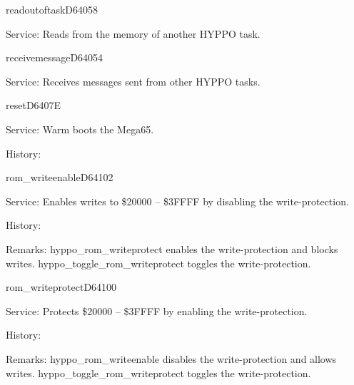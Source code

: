 \begin{hyppotrap}{readoutoftask}{D640}{58}
\item [Service:]
  Reads from the memory of another HYPPO task.
\notimplemented
\end{hyppotrap}


\begin{hyppotrap}{receivemessage}{D640}{54}
\item [Service:]
  Receives messages sent from other HYPPO tasks.
\notimplemented
\end{hyppotrap}


\newpage
\begin{hyppotrap}{reset}{D640}{7E}
\item [Service:]
  Warm boots the Mega65.
\item [History:]
\end{hyppotrap}


\newpage
\begin{hyppotrap}{rom\_writeenable}{D641}{02}
\item [Service:]
  Enables writes to \$20000 -- \$3FFFF by disabling the write-protection.
\item [History:]
\item [Remarks:]
  hyppo\_rom\_writeprotect enables the write-protection and blocks writes.
  hyppo\_toggle\_rom\_writeprotect toggles the write-protection.
\end{hyppotrap}


\newpage
\begin{hyppotrap}{rom\_writeprotect}{D641}{00}
\item [Service:]
  Protects \$20000 -- \$3FFFF by enabling the write-protection.
\item [History:]
\item [Remarks:]
  hyppo\_rom\_writeenable disables the write-protection and allows writes.
  hyppo\_toggle\_rom\_writeprotect toggles the write-protection.
\end{hyppotrap}


